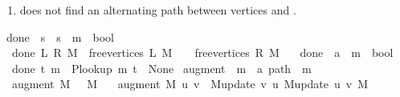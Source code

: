 \begin{isabellebody}
\begin{isamarkuptext}
\begin{enumerate}
\item {} does not find an alternating path between vertices  and .%
\end{enumerate}%
\end{isamarkuptext}\isamarkuptrue%
\isamarkupfalse%
\ done{\isacharunderscore}{\kern0pt}{}\ {\isacharcolon}{\kern0pt}{\isacharcolon}{\kern0pt}\ {\isachardoublequoteopen}{\isacharprime}{\kern0pt}s\ {\isasymRightarrow}\ {\isacharprime}{\kern0pt}s\ {\isasymRightarrow}\ {\isacharprime}{\kern0pt}m\ {\isasymRightarrow}\ bool{\isachardoublequoteclose}\ \isanewline
\ \ {\isachardoublequoteopen}done{\isacharunderscore}{\kern0pt}{}\ L\ R\ M\ {\isasymequiv}\ free{\isacharunderscore}{\kern0pt}vertices\ L\ M\ {\isacharequal}{\kern0pt}\ {\isacharbrackleft}{\kern0pt}{\isacharbrackright}{\kern0pt}\ {\isasymor}\ free{\isacharunderscore}{\kern0pt}vertices\ R\ M\ {\isacharequal}{\kern0pt}\ {\isacharbrackleft}{\kern0pt}{\isacharbrackright}{\kern0pt}{\isachardoublequoteclose}\isanewline
\isanewline
{}\isamarkupfalse%
\ done{\isacharunderscore}{\kern0pt}{}\ {\isacharcolon}{\kern0pt}{\isacharcolon}{\kern0pt}\ {\isachardoublequoteopen}{\isacharprime}{\kern0pt}a\ {\isasymRightarrow}\ {\isacharprime}{\kern0pt}m\ {\isasymRightarrow}\ bool{\isachardoublequoteclose}\ \isanewline
\ \ {\isachardoublequoteopen}done{\isacharunderscore}{\kern0pt}{}\ t\ m\ {\isasymequiv}\ P{\isacharunderscore}{\kern0pt}lookup\ m\ t\ {\isacharequal}{\kern0pt}\ None{\isachardoublequoteclose}\isanewline
\isanewline
\isanewline
{}\isamarkupfalse%
\ augment\ {\isacharcolon}{\kern0pt}{\isacharcolon}{\kern0pt}\ {\isachardoublequoteopen}{\isacharprime}{\kern0pt}m\ {\isasymRightarrow}\ {\isacharprime}{\kern0pt}a\ path\ {\isasymRightarrow}\ {\isacharprime}{\kern0pt}m{\isachardoublequoteclose}\ \isanewline
\ \ {\isachardoublequoteopen}augment\ M\ {\isacharbrackleft}{\kern0pt}{\isacharbrackright}{\kern0pt}\ {\isacharequal}{\kern0pt}\ M{\isachardoublequoteclose}\ {\isacharbar}{\kern0pt}\isanewline
\ \ {\isachardoublequoteopen}augment\ M\ {\isacharbrackleft}{\kern0pt}u{\isacharcomma}{\kern0pt}\ v{\isacharbrackright}{\kern0pt}\ {\isacharequal}{\kern0pt}\ {\isacharparenleft}{\kern0pt}M{\isacharunderscore}{\kern0pt}update\ v\ u\ {\isacharparenleft}{\kern0pt}M{\isacharunderscore}{\kern0pt}update\ u\ v\ M{\isacharparenright}{\kern0pt}{\isacharparenright}{\kern0pt}{\isachardoublequoteclose}\ {\isacharbar}{\kern0pt}\isanewline

\end{isabellebody}
